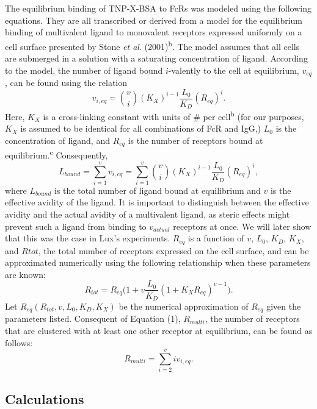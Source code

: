 The equilibrium binding of TNP-X-BSA to Fc\textgamma{}Rs was modeled using the following equations. They are all transcribed or derived from a model for the equilibrium binding of multivalent ligand to monovalent receptors expressed uniformly on a cell surface presented by Stone \textit{et al}. (2001)\textsuperscript{b}. The model assumes that all cells are submerged in a solution with a saturating concentration of ligand. According to the model, the number of ligand bound $i$-valently to the cell at equilibrium, $v_{eq}$, can be found using the relation
\begin{equation}
v_{i,eq} = {v\choose i} (K_X)^{i-1} \frac{L_0}{K_D} (R_{eq})^i.
\end{equation}
Here, $K_X$ is a cross-linking constant with units of \# per cell\textsuperscript{b} (for our purposes, $K_X$ is assumed to be identical for all combinations of Fc\textgamma{}R and IgG,) $L_0$ is the concentration of ligand, and $R_{eq}$ is the number of receptors bound at equilibrium.\textsuperscript{c} Consequently,
\begin{equation}
L_{bound} = \sum_{i=1}^{v} v_{i,eq} = \sum_{i=1}^{v} {v\choose i} (K_X)^{i-1} \frac{L_0}{K_D} (R_{eq})^i,
\end{equation}
where $L_{bound}$ is the total number of ligand bound at equilibrium and $v$ is the effective avidity of the ligand. It is important to distinguish between the effective avidity and the actual avidity of a multivalent ligand, as steric effects might prevent such a ligand from binding to $v_{actual}$ receptors at once. We will later show that this was the case in Lux's experiments. $R_{eq}$ is a function of $v$, $L_0$, $K_D$, $K_X$, and $Rtot$, the total number of receptors expressed on the cell surface, and can be approximated numerically using the following relationship when these parameters are known:
\begin{equation}
R_{tot} = R_{eq} \Big(1+v \frac{L_0}{K_D} (1+K_X R_{eq})^{v-1}\Big).
\end{equation}
Let $R_{eq}(R_{tot},v,L_0,K_D,K_X)$ be the numerical approximation of $R_{eq}$ given the parameters listed. Consequent of Equation (1), $R_{multi}$, the number of receptors that are clustered with at least one other receptor at equilibrium, can be found as follows:
\begin{equation}
R_{multi} = \sum_{i=2}^{v} iv_{i,eq}.
\end{equation}


\subsection{Calculations}

